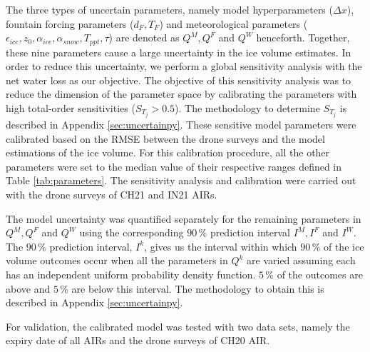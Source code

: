 

The three types of uncertain parameters, namely model hyperparameters ($\Delta x$), fountain forcing parameters
($d_F, T_F$) and meteorological parameters ($\epsilon_{ice}, z_0, \alpha_{ice}, \alpha_{snow}, T_{ppt}, \tau$) are
denoted as $Q^M, Q^F$ and $Q^W$ henceforth. Together, these nine parameters cause a large uncertainty in the ice
volume estimates. In order to reduce this uncertainty, we perform a global sensitivity analysis with the net
water loss as our objective. The objective of this sensitivity analysis was to reduce the dimension of the
parameter space by calibrating the parameters with high total-order sensitivities ($S_{T_{j}} > 0.5$). The
methodology to determine $S_{T_{j}}$ is described in Appendix \ref{sec:uncertainpy}. These sensitive model
parameters were calibrated based on the \ac{RMSE} between the drone surveys and the model
estimations of the ice volume. For this calibration procedure, all the other parameters were set to the median
value of their respective ranges defined in Table \ref{tab:parameters}.  The sensitivity analysis and
calibration were carried out with the drone surveys of CH21 and IN21 \ac{AIRs}.

The model uncertainty was quantified separately for the remaining parameters in $Q^M, Q^F$ and $Q^W$ using the
corresponding $90\, \%$ prediction interval $I^M, I^F$ and $I^W$. The $90\, \%$ prediction interval, $I^k$, gives us the
interval within which $90\,\%$ of the ice volume outcomes occur when all the parameters in $Q^k$ are varied
assuming each has an independent uniform probability density function. $5\,\%$ of the outcomes are above and
$5\,\%$ are below this interval. The methodology to obtain this is described in Appendix \ref{sec:uncertainpy}.

For validation, the calibrated model was tested with two data sets, namely the expiry date of all \ac{AIRs} and the
drone surveys of CH20 AIR.

